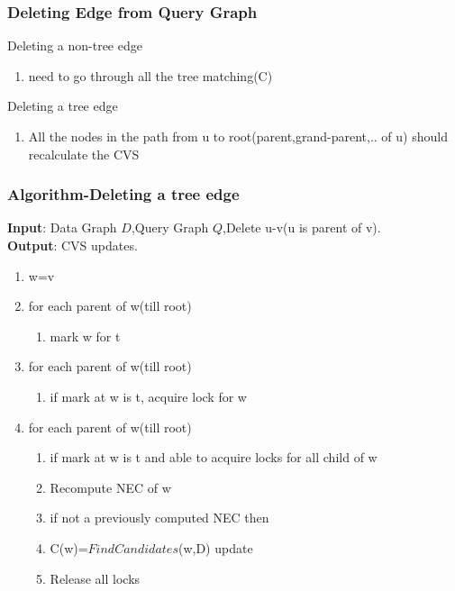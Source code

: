 \documentclass{beamer}
\begin{document}
\begin{frame}
\frametitle{Deleting Edge from Query Graph }
\begin{block}{Deleting a non-tree edge}
\begin{enumerate}
\item need to go through all the tree matching(C)
\end{enumerate}

\end{block}
\begin{block}{Deleting a tree edge}
\begin{enumerate}
\item All the nodes in the path from u to root(parent,grand-parent,.. of u) should recalculate the CVS
\end{enumerate}

\end{block}
\end{frame}
\begin{frame}
\frametitle{Algorithm-Deleting a tree edge }
\begin{algorithm}[H]
\caption{Dynamic tree edge deletion of thread t}
\textbf{Input}: Data Graph $D$,Query Graph $Q$,Delete u-v(u is parent of v).\\
\textbf{Output}: CVS updates.\\
\begin{algorithmic}
 \item \begin{enumerate}
 \item w=v
\item for each parent of w(till root)
 \begin{enumerate}
\item mark w for t
\end{enumerate}
\item for each parent of w(till root)
 \begin{enumerate}
\item if mark at w is t, acquire lock for w
\end{enumerate}
\item for each parent of w(till root)
\begin{enumerate}
\item if mark at w is t and able to acquire locks for all child of w 
\item Recompute NEC of w
\item if not a previously computed NEC then
\item  \hspace{10mm}C(w)=$FindCandidates$(w,D) update
\item Release all locks
\end{enumerate}
\end{enumerate}
\end{algorithmic}
\label{alg:treeedge}
\end{algorithm}
\end{frame}
\end{document}
